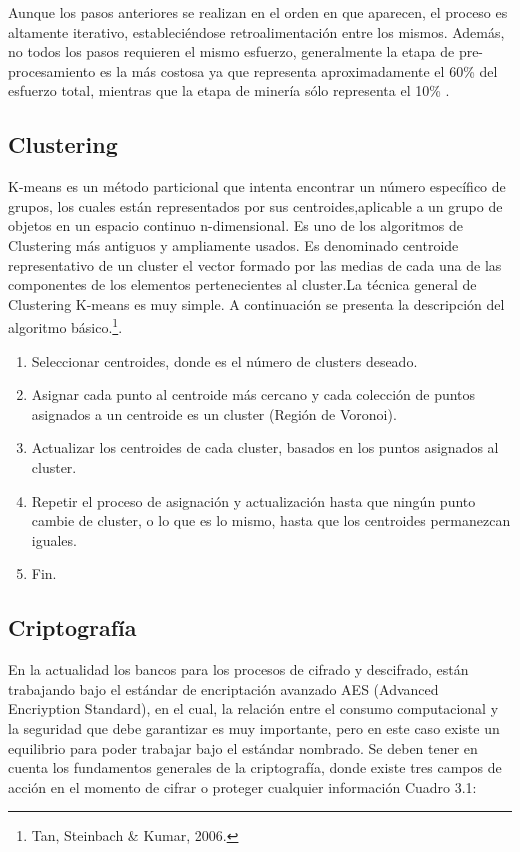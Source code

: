 \documentclass[a4paper,openright,12pt]{book}
\theoremstyle{definition}
\theoremstyle{remark}
\begin{document}
Aunque los pasos anteriores se realizan en el orden en que aparecen, el proceso es altamente iterativo, estableciéndose retroalimentación entre los mismos. Además, no todos los pasos requieren el mismo esfuerzo, generalmente la etapa de pre-procesamiento es la más costosa ya que representa aproximadamente el 60\% del esfuerzo total, mientras que la etapa de minería sólo representa el 10\% . 

\subsection{Clustering}

K-means es un método particional que intenta encontrar un número específico de grupos, los cuales están representados por sus centroides,aplicable a un grupo de objetos en un espacio continuo n-dimensional. Es uno de los algoritmos de Clustering más antiguos y ampliamente usados.
Es denominado centroide representativo de un cluster el vector formado por las medias de cada una de las componentes de los elementos pertenecientes
al cluster.La técnica general de Clustering K-means es muy simple. A continuación se presenta la descripción del algoritmo básico.\footnote{Tan, Steinbach \& Kumar, 2006.}.

\begin{enumerate}
	\item Seleccionar centroides, donde es el número de clusters deseado.
    \item Asignar cada punto al centroide más cercano y cada colección de puntos asignados a un centroide es un cluster (Región de Voronoi).
    \item Actualizar los centroides de cada cluster, basados en los puntos asignados al cluster.
    \item Repetir el proceso de asignación y actualización hasta que ningún punto cambie de cluster, o lo que es lo mismo, hasta que los centroides permanezcan iguales.
    \item Fin.
\end{enumerate}

    \subsection{Criptografía}
    En la actualidad los bancos para los procesos de cifrado y descifrado, están trabajando bajo el estándar de encriptación avanzado AES (Advanced Encriyption Standard), en el cual, la relación entre el consumo computacional y la seguridad que debe garantizar es muy importante, pero en este caso existe un equilibrio para poder trabajar bajo el estándar nombrado. Se deben tener en cuenta los fundamentos generales de la criptografía, donde existe tres campos de acción en el momento de cifrar o proteger cualquier información Cuadro 3.1: 
\end{document}
